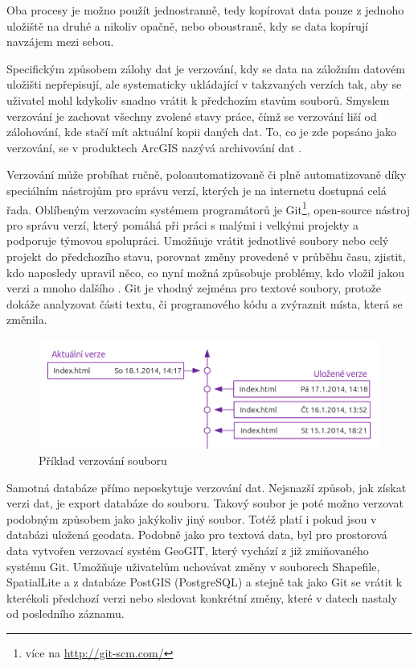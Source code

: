 Oba procesy je možno použít jednostranně, tedy kopírovat data pouze z jednoho uložiště na druhé a nikoliv opačně, nebo oboustraně, kdy se data kopírují navzájem mezi sebou.

Specifickým způsobem zálohy dat je verzování, kdy se data na záložním datovém uložišti nepřepisují, ale systematicky ukládající v takzvaných verzích tak, aby se uživatel mohl kdykoliv snadno vrátit k předchozím stavům souborů. Smyslem verzování je zachovat všechny zvolené stavy práce, čímž se verzování liší od zálohování, kde stačí mít aktuální kopii daných dat. To, co je zde popsáno jako verzování, se v produktech ArcGIS nazývá archivování dat \citep{Law2008}. 

Verzování může probíhat ručně, poloautomatizovaně či plně automatizovaně díky speciálním nástrojům pro správu verzí, kterých je na internetu dostupná celá řada. Oblíbeným verzovacím systémem programátorů je Git\footnote{více na \url{http://git-scm.com/}}, open-source nástroj pro správu verzí, který pomáhá při práci s malými i velkými projekty a podporuje týmovou spolupráci. Umožňuje vrátit jednotlivé soubory nebo celý projekt do předchozího stavu, porovnat změny provedené v průběhu času, zjistit, kdo naposledy upravil něco, co nyní možná způsobuje problémy, kdo vložil jakou verzi a mnoho dalšího \citep{Chacon2009}. Git je vhodný zejména pro textové soubory, protože dokáže analyzovat části textu, či programového kódu a zvýraznit místa, která se změnila.
        
          \begin{figure}[H]
            \centering
            \includegraphics[scale=1]{../../../grafy/obr/schema_verzovani_maxiTence.png}
            \caption {Příklad verzování souboru}
          \end{figure}

          Samotná databáze přímo  neposkytuje verzování dat. Nejsnazší způsob, jak získat verzi dat, je export databáze do souboru. Takový soubor je poté možno verzovat podobným způsobem jako jakýkoliv jiný soubor. Totéž platí i pokud jsou v databázi uložená geodata. Podobně jako pro textová data, byl pro prostorová data vytvořen verzovací systém GeoGIT, který vychází z již zmiňovaného systému Git. Umožňuje uživatelům uchovávat změny v souborech Shapefile, SpatialLite a z databáze PostGIS (PostgreSQL) a stejně tak jako Git se vrátit k kterékoli předchozí verzi nebo sledovat konkrétní změny, které v datech nastaly od posledního záznamu. 

